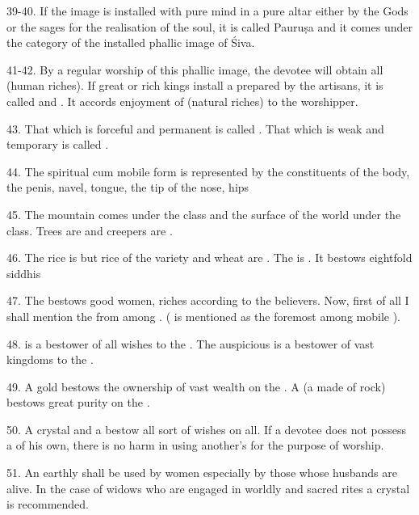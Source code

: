 39-40. If the image is installed with pure mind in a pure altar either by
the Gods or the sages for the realisation of the soul, it is called Pauruṣa and
it comes under the category of the installed phallic image of Śiva.

41-42. By a regular worship of this phallic image, the devotee will obtain all
 (human riches). If great  or rich kings
install a  prepared by the artisans, it is called  and
. It accords enjoyment of  (natural riches) to
the worshipper.

43. That which is forceful and permanent is called . That which is
weak and temporary is called .

44. The spiritual cum mobile form is represented by the constituents of the body,
\viz the penis, navel, tongue, the tip of the nose, hips \etc

45. The mountain comes under the  class and the surface of the world
under the  class. Trees \etc are  and creepers \etc are
.

46. The  rice is  but rice of the  variety and
wheat are . The  is . It bestows eightfold
siddhis \viz {} \etc

47. The  bestows good women, riches \etc according to
the believers. Now, first of all I shall mention the  from among
. ( is mentioned as the foremost among mobile
).

48.  is a bestower of all wishes to the .
The auspicious  is a bestower of vast kingdoms to
the .

49. A gold  bestows the ownership of vast wealth on the .
A  (a  made of rock) bestows great purity on
the .

50. A crystal  and a  bestow all sort of wishes on all.
If a devotee does not possess a  of his own, there is no harm in
using another’s  for the purpose of worship.

51. An earthly  shall be used by women especially by those whose
husbands are alive. In the case of widows who are engaged in worldly and sacred
rites a crystal  is recommended.


